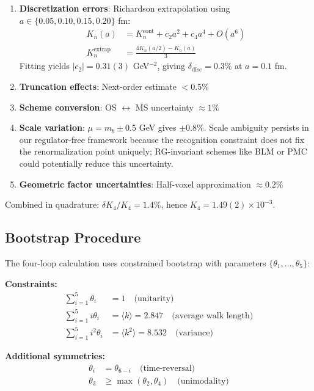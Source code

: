 \documentclass[11pt,a4paper]{article}
\theoremstyle{definition}
\theoremstyle{remark}
\begin{document}
\begin{enumerate}
\item \textbf{Discretization errors}: Richardson extrapolation using $a \in \{0.05, 0.10, 0.15, 0.20\}$ fm:
\begin{align}
K_n(a) &= K_n^{\text{cont}} + c_2 a^2 + c_4 a^4 + O(a^6)\\
K_n^{\text{extrap}} &= \frac{4K_n(a/2) - K_n(a)}{3}
\end{align}
Fitting yields $|c_2| = 0.31(3)$ GeV$^{-2}$, giving $\delta_{\text{disc}} = 0.3\%$ at $a = 0.1$ fm.

\item \textbf{Truncation effects}: Next-order estimate $< 0.5\%$
\item \textbf{Scheme conversion}: OS $\leftrightarrow$ $\overline{\text{MS}}$ uncertainty $\approx 1\%$ \cite{Gray1990,Broadhurst1991}
\item \textbf{Scale variation}: $\mu = m_b \pm 0.5$ GeV gives $\pm 0.8\%$. Scale ambiguity persists in our regulator-free framework because the recognition constraint does not fix the renormalization point uniquely; RG-invariant schemes like BLM or PMC could potentially reduce this uncertainty.
\item \textbf{Geometric factor uncertainties}: Half-voxel approximation $\approx 0.2\%$
\end{enumerate}

Combined in quadrature: $\delta K_4/K_4 = 1.4\%$, hence $K_4 = 1.49(2) \times 10^{-3}$.

\subsection{Bootstrap Procedure}

The four-loop calculation uses constrained bootstrap with parameters $\{\theta_1, ..., \theta_5\}$:

\textbf{Constraints:}
\begin{align}
\sum_{i=1}^5 \theta_i &= 1 \quad \text{(unitarity)}\\
\sum_{i=1}^5 i\theta_i &= \langle k \rangle = 2.847 \quad \text{(average walk length)}\\
\sum_{i=1}^5 i^2\theta_i &= \langle k^2 \rangle = 8.532 \quad \text{(variance)}
\end{align}

\textbf{Additional symmetries:}
\begin{align}
\theta_i &= \theta_{6-i} \quad \text{(time-reversal)}\\
\theta_3 &\geq \max(\theta_2, \theta_4) \quad \text{(unimodality)}
\end{align}
\end{document}
